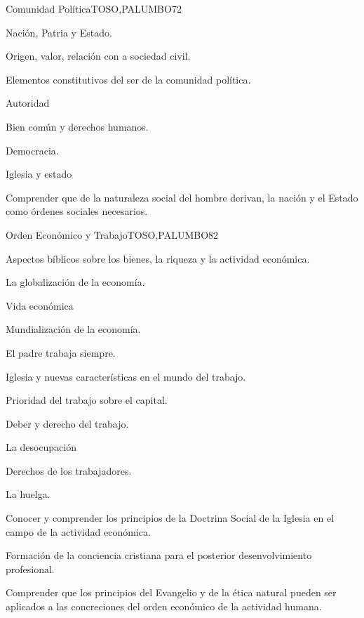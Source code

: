 \begin{syllabus}
\begin{unit}{Comunidad Política}{TOSO,PALUMBO}{7}{2}
\begin{topics}
	\item Nación, Patria y Estado.
	\item Origen, valor, relación con a sociedad civil.
	\item Elementos constitutivos del ser de la comunidad política.
	\item Autoridad
	\item Bien común y derechos humanos.
	\item Democracia.
	\item Iglesia y estado
\end{topics}
\begin{learningoutcomes}
	\item Comprender que de la naturaleza social del hombre derivan, la nación y el Estado como órdenes sociales necesarios.
\end{learningoutcomes}
\end{unit}

\begin{unit}{Orden Económico y Trabajo}{TOSO,PALUMBO}{8}{2}
\begin{topics}
	\item Aspectos bíblicos sobre los bienes, la riqueza y la actividad económica.
	\item La globalización de la economía.
	\item Vida económica
	\item Mundialización de la economía.
	\item El padre trabaja siempre.
	\item Iglesia y nuevas características en el mundo del trabajo.
	\item Prioridad del trabajo sobre el capital.
	\item Deber y derecho del trabajo.
	\item La desocupación
	\item Derechos de los trabajadores.
	\item La huelga.
\end{topics}
\begin{learningoutcomes}
	\item Conocer y comprender los principios de la Doctrina Social de la Iglesia en el campo de la actividad económica.
	\item Formación de la conciencia cristiana para el posterior desenvolvimiento profesional.
	\item Comprender que los principios del Evangelio y de la ética natural pueden ser aplicados a las concreciones del orden económico de la actividad humana.
\end{learningoutcomes}
\end{unit}



\begin{coursebibliography}
\end{coursebibliography}

\end{syllabus}
